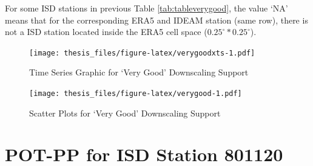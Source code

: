 \documentclass[12pt,oneside]{reedthesis}
\begin{document}
For some ISD stations in previous Table \ref{tab:tableverygood}, the value `NA' means that for the corresponding ERA5 and IDEAM station (same row), there is not a ISD station located inside the ERA5 cell space (\(0.25^\circ * 0.25^\circ\)).
\begin{figure}
\centering
\texttt{[image: thesis\_files/figure-latex/verygoodxts-1.pdf]}
\caption{\label{fig:verygoodxts}Time Series Graphic for `Very Good' Downscaling Support}
\end{figure}
\begin{figure}
\centering
\texttt{[image: thesis\_files/figure-latex/verygood-1.pdf]}
\caption{\label{fig:verygood}Scatter Plots for `Very Good' Downscaling Support}
\end{figure}
\hypertarget{pot-pp-for-isd-station-801120}{%
\section{POT-PP for ISD Station 801120}\label{pot-pp-for-isd-station-801120}}
\end{document}
